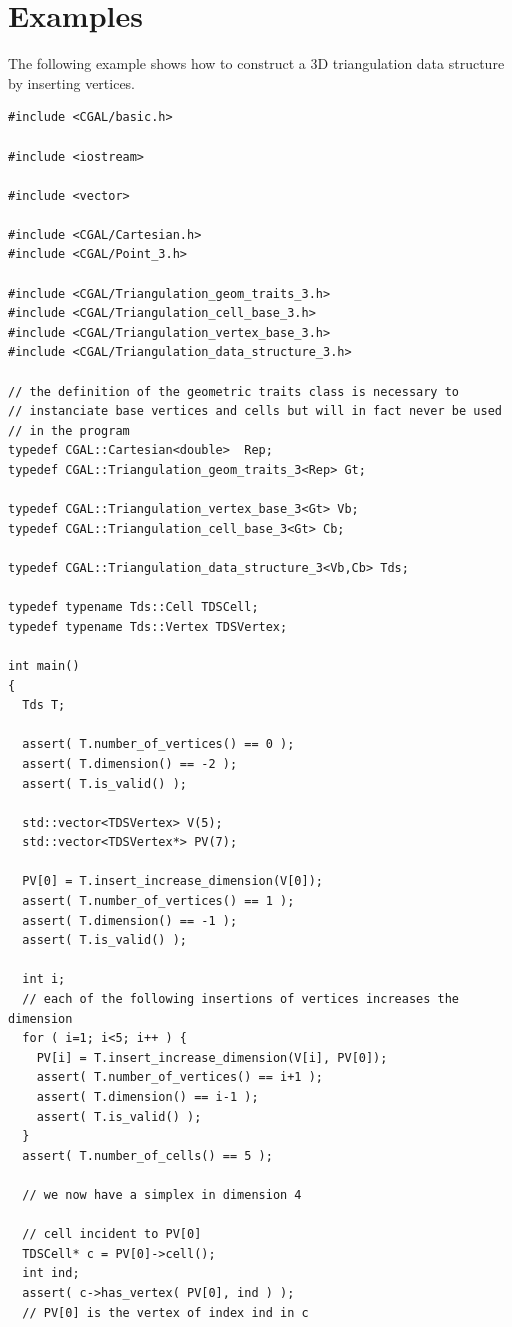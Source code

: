\section{Examples}
\label{TDS3-sec-examples}
The following example shows how to construct a 3D triangulation data
structure by inserting vertices.
\begin{verbatim}
#include <CGAL/basic.h>

#include <iostream>

#include <vector>

#include <CGAL/Cartesian.h>
#include <CGAL/Point_3.h>

#include <CGAL/Triangulation_geom_traits_3.h>
#include <CGAL/Triangulation_cell_base_3.h>
#include <CGAL/Triangulation_vertex_base_3.h>
#include <CGAL/Triangulation_data_structure_3.h>

// the definition of the geometric traits class is necessary to
// instanciate base vertices and cells but will in fact never be used
// in the program 
typedef CGAL::Cartesian<double>  Rep;
typedef CGAL::Triangulation_geom_traits_3<Rep> Gt;

typedef CGAL::Triangulation_vertex_base_3<Gt> Vb;
typedef CGAL::Triangulation_cell_base_3<Gt> Cb;

typedef CGAL::Triangulation_data_structure_3<Vb,Cb> Tds;

typedef typename Tds::Cell TDSCell;
typedef typename Tds::Vertex TDSVertex;

int main()
{
  Tds T;

  assert( T.number_of_vertices() == 0 );
  assert( T.dimension() == -2 );
  assert( T.is_valid() );

  std::vector<TDSVertex> V(5);
  std::vector<TDSVertex*> PV(7);

  PV[0] = T.insert_increase_dimension(V[0]);
  assert( T.number_of_vertices() == 1 );
  assert( T.dimension() == -1 );
  assert( T.is_valid() );

  int i;
  // each of the following insertions of vertices increases the dimension
  for ( i=1; i<5; i++ ) {
    PV[i] = T.insert_increase_dimension(V[i], PV[0]);
    assert( T.number_of_vertices() == i+1 );
    assert( T.dimension() == i-1 );
    assert( T.is_valid() );
  }
  assert( T.number_of_cells() == 5 );

  // we now have a simplex in dimension 4

  // cell incident to PV[0]
  TDSCell* c = PV[0]->cell();
  int ind;
  assert( c->has_vertex( PV[0], ind ) );
  // PV[0] is the vertex of index ind in c


\end{verbatim}
